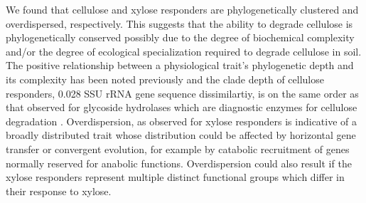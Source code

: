 We found that cellulose and xylose responders are phylogenetically clustered
and overdispersed, respectively. This suggests that the ability to degrade
cellulose is phylogenetically conserved possibly due to the degree of
biochemical complexity and/or the degree of ecological specialization required
to degrade cellulose in soil. The positive relationship between a physiological
trait’s phylogenetic depth and its complexity has been noted previously
\citep{Martiny2013} and the clade depth of cellulose responders, 0.028 SSU
rRNA gene sequence dissimilartiy, is on the same order as that observed
for glycoside hydrolases which are diagnostic enzymes for cellulose
degradation \citep{Berlemont2013}. Overdispersion, as observed for xylose
responders is indicative of a broadly distributed trait whose distribution
could be affected by horizontal gene transfer or convergent evolution, for
example by catabolic recruitment of genes normally reserved for anabolic
functions. Overdispersion could also result if the xylose responders
represent multiple distinct functional groups which differ in their
response to xylose. 

